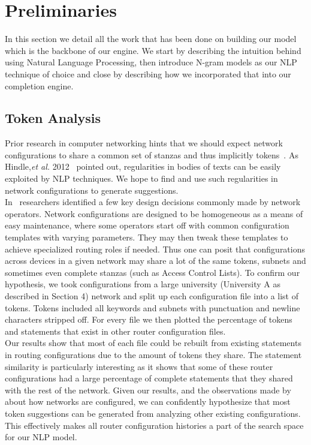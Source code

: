 \documentclass[../thesis.tex]{subfiles}
\begin{document}
\chapter{Preliminaries}
\label{ch:prelim}

In this section we detail all the work that has been done on building our model which is the backbone of our engine. We start by describing the intuition behind using Natural Language Processing, then introduce N-gram models as our NLP technique of choice and close by describing how we incorporated that into our completion engine.

\section{Token Analysis}
Prior research in computer networking hints that we should expect network configurations to share a common set of stanzas and thus implicitly tokens~\cite{Benson}. As Hindle,\textit{et al.} 2012~\cite{naturalness} pointed out, regularities in bodies of texts can be easily exploited by NLP techniques. We hope to find and use such regularities in network configurations to generate suggestions.\\

In~\cite{complexity} researchers identified a few key design decisions commonly made by network operators. Network configurations are designed to be homogeneous as a means of easy maintenance, where some operators start off with common configuration templates with varying parameters. They may then tweak these templates to achieve specialized routing roles if needed. Thus one can posit that configurations across devices in a given network may share a lot of the same tokens, subnets and sometimes even complete stanzas (such as Access Control Lists). To confirm our hypothesis, we took configurations from a large university (University A as described in Section 4) network and split up each configuration file into a list of tokens. Tokens included all keywords and subnets with punctuation and newline characters stripped off. For every file we then plotted the percentage of tokens and statements that exist in other router configuration files.\\

Our results show that most of each file could be rebuilt from existing statements in routing configurations due to the amount of tokens they share. The statement similarity is particularly interesting as it shows that some of these router configurations had a large percentage of complete statements that they shared with the rest of the network. Given our results, and the observations made by~\cite{complexity} about how networks are configured, we can confidently hypothesize that most token suggestions can be generated from analyzing other existing configurations. This effectively makes all router configuration histories a part of the search space for our NLP model. 
\end{document}

